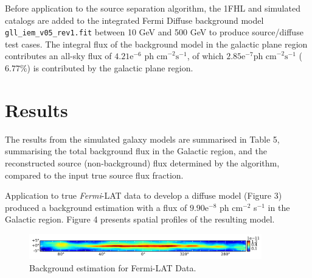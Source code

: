\documentclass{PoS}
\begin{document}
Before application to the source separation algorithm, the 1FHL and simulated catalogs are added to the integrated Fermi Diffuse background model \verb|gll_iem_v05_rev1.fit| between 10 GeV and 500 GeV to produce source/diffuse test cases. The integral flux of the background model in the galactic plane region contributes an all-sky flux of $4.21\text{e}^{-6}$ $ \text{ph cm}^{-2} \text{s}^{-1}$, of which $2.85\text{e}^{-7} \text{ph cm}^{-2}\text{s}^{-1}$ ($6.77\%$) is contributed by the galactic plane region.


\section{Results}

The results from the simulated galaxy models are summarised in Table 5, summarising the total background flux in the Galactic region, and the reconstructed source (non-background) flux determined by the algorithm, compared to the input true source flux fraction.

\begin{table}
\centering
{}
\makeatletter
\def\@captype{table}
\makeatother
\caption{Galactic plane recovered background fluxes}
\end{table}

Application to true \textit{Fermi}-LAT data to develop a diffuse model (Figure 3) produced a background estimation with a flux of $9.90\text{e}^{-8}$ ph cm$^{-2}$ s$^{-1}$ in the Galactic region. Figure 4 presents spatial profiles of the resulting model.

\begin{figure}
  \begin{center}
      \includegraphics[width=0.9\textwidth]{figures/BG_DATA.pdf}
  \caption{Background estimation for Fermi-LAT Data.}
  \end{center}
\end{figure}
\end{document}
